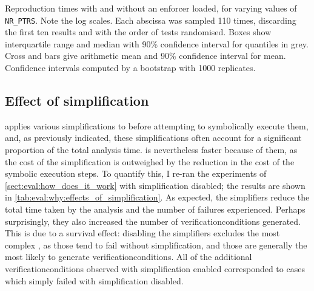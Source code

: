 \begin{sanefig}
  \caption{Reproduction times with and without an enforcer loaded, for
    varying values of \texttt{NR\_PTRS}.  Note the log scales.  Each
    abscissa was sampled 110 times, discarding the first ten results
    and with the order of tests randomised.  Boxes show interquartile
    range and median with 90\% confidence interval for quantiles in
    grey.  Cross and bars give arithmetic mean and 90\% confidence
    interval for mean.  Confidence intervals computed by a bootstrap
    with 1000 replicates.}
  \label{fig:eval:indexed_toctou:nr_ptrs}
\end{sanefig}

\subsection{Effect of {\StateMachine} simplification}

{\Technique} applies various simplifications to {\StateMachines}
before attempting to symbolically execute them, and, as previously
indicated, these simplifications often account for a significant
proportion of the total analysis time.  {\Technique} is nevertheless
faster because of them, as the cost of the simplification is
outweighed by the reduction in the cost of the symbolic execution
steps.  To quantify this, I re-ran the experiments of
\autoref{sect:eval:how_does_it_work} with {\StateMachine}
simplification disabled; the results are shown in
\autoref{tab:eval:why:effects_of_simplification}.  As expected, the
simplifiers reduce the total time taken by the analysis and the number
of failures experienced.  Perhaps surprisingly, they also increased
the number of \glspl{verificationcondition} generated.  This is due to
a survival effect: disabling the simplifiers excludes the most complex
{\StateMachines}, as those tend to fail without simplification, and
those are generally the most likely to generate
\glspl{verificationcondition}.  All of the additional
\glspl{verificationcondition} observed with simplification enabled
corresponded to cases which simply failed with simplification
disabled.

